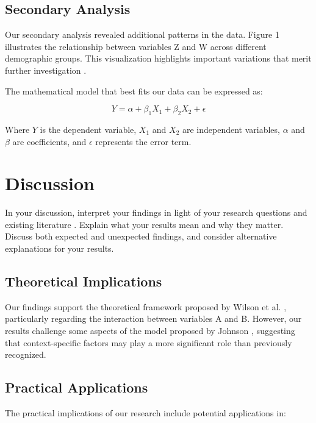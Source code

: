 \documentclass[11pt]{article}
\begin{document}
\subsection{Secondary Analysis}

Our secondary analysis revealed additional patterns in the data. Figure 1 illustrates the relationship between variables Z and W across different demographic groups. This visualization highlights important variations that merit further investigation \cite{jones2019research}.

The mathematical model that best fits our data can be expressed as:

\begin{equation}
Y = \alpha + \beta_1 X_1 + \beta_2 X_2 + \epsilon
\end{equation}

Where $Y$ is the dependent variable, $X_1$ and $X_2$ are independent variables, $\alpha$ and $\beta$ are coefficients, and $\epsilon$ represents the error term.

\section{Discussion}
\label{sec:discussion}

In your discussion, interpret your findings in light of your research questions and existing literature \cite{taylor2022integration}. Explain what your results mean and why they matter. Discuss both expected and unexpected findings, and consider alternative explanations for your results.

\subsection{Theoretical Implications}

Our findings support the theoretical framework proposed by Wilson et al. \cite{wilson2021theoretical}, particularly regarding the interaction between variables A and B. However, our results challenge some aspects of the model proposed by Johnson \cite{johnson2019methods}, suggesting that context-specific factors may play a more significant role than previously recognized.

\subsection{Practical Applications}

The practical implications of our research include potential applications in:
\end{document}
